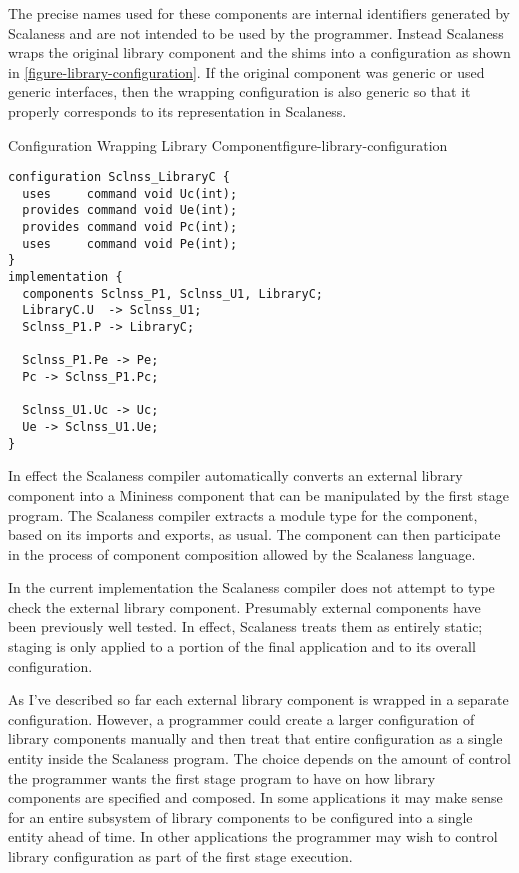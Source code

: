 The precise names used for these components are internal identifiers generated by Scalaness and
are not intended to be used by the programmer. Instead Scalaness wraps the original library
component and the shims into a configuration as shown in \autoref{figure-library-configuration}.
If the original component was generic or used generic interfaces, then the wrapping
configuration is also generic so that it properly corresponds to its representation in
Scalaness.

\singlespace
\begin{fpfig}[tbhp]{Configuration Wrapping Library Component}{figure-library-configuration}
{
\begin{Verbatim}[fontsize=\small]
configuration Sclnss_LibraryC {
  uses     command void Uc(int);
  provides command void Ue(int);
  provides command void Pc(int);
  uses     command void Pe(int);
}
implementation {
  components Sclnss_P1, Sclnss_U1, LibraryC;
  LibraryC.U  -> Sclnss_U1;
  Sclnss_P1.P -> LibraryC;

  Sclnss_P1.Pe -> Pe;
  Pc -> Sclnss_P1.Pc;
  
  Sclnss_U1.Uc -> Uc;
  Ue -> Sclnss_U1.Ue;
}
\end{Verbatim}
}
\end{fpfig}
\primaryspacing

In effect the Scalaness compiler automatically converts an external library component into a
Mininess component that can be manipulated by the first stage program. The Scalaness compiler
extracts a module type for the component, based on its imports and exports, as usual. The
component can then participate in the process of component composition allowed by the Scalaness
language.

In the current implementation the Scalaness compiler does not attempt to type check the external
library component. Presumably external components have been previously well tested. In effect,
Scalaness treats them as entirely static; staging is only applied to a portion of the final
application and to its overall configuration.


As I've described so far each external library component is wrapped in a separate configuration.
However, a programmer could create a larger configuration of library components manually and
then treat that entire configuration as a single entity inside the Scalaness program. The choice
depends on the amount of control the programmer wants the first stage program to have on how
library components are specified and composed. In some applications it may make sense for an
entire subsystem of library components to be configured into a single entity ahead of time. In
other applications the programmer may wish to control library configuration as part of the first
stage execution.

